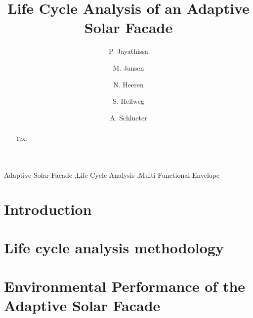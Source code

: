 \documentclass[preprint,12pt]{elsarticle} %
\begin{document}
\begin{frontmatter}

\title{Life Cycle Analysis of an Adaptive Solar Facade} 


\author[ita]{P. Jayathissa }

\author[ita]{M. Jansen}

\author[baug]{N. Heeren}

\author[baug]{S. Hellweg}

\author[ita]{A. Schlueter  }



\address[ita]{Architecture and Building Systems, Institute of Technology in Architecture,\\ ETH Zurich, Switzerland} 
\address[baug]{Ecological System Design, Institute of Environmental Engineering,\\ ETH Zurich, Switzerland}

\begin{abstract}
Text 
\end{abstract}

\begin{keyword}
Adaptive Solar Facade \sep Life Cycle Analysis \sep Multi Functional Envelope
\end{keyword}

\end{frontmatter}

\section{Introduction}
\label{ch:introduction}


\section{Life cycle analysis methodology}
\label{ch:method}


\section{Environmental Performance of the Adaptive Solar Facade}
\label{ch:profile}

\end{document}
